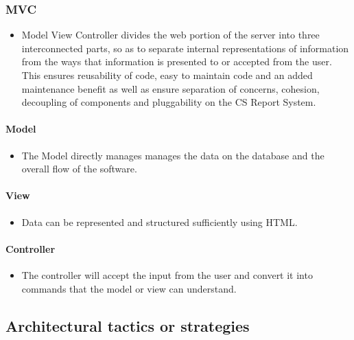 \documentclass{article}
\begin{document}
           \subsubsection{MVC} %
            \begin{itemize}
          \item  Model View Controller divides the web portion of the server into three interconnected parts, so as 					to 	separate internal representations of information from the ways that information is presented to or 					accepted from the user. This ensures reusability  of code, easy to maintain code and an added maintenance 			beneﬁt as well as ensure separation of concerns, cohesion, decoupling of components and pluggability on 					the CS 	Report System.
			\end{itemize}         	
        	
         
            \paragraph{Model} %
            \begin{itemize}
            \item The Model directly manages manages the data on the database and the overall flow of the software.
            \end{itemize} 
            \paragraph{View} %
              \begin{itemize}
            \item Data can be represented and structured sufficiently using HTML.
            \end{itemize} 
            \paragraph{Controller} %
              \begin{itemize}
            \item The controller will accept the input from the user and convert it into commands that 		the 					model or view can understand.
            
              \end{itemize} 		
		

		\subsection{Architectural tactics or strategies}
\end{document}

